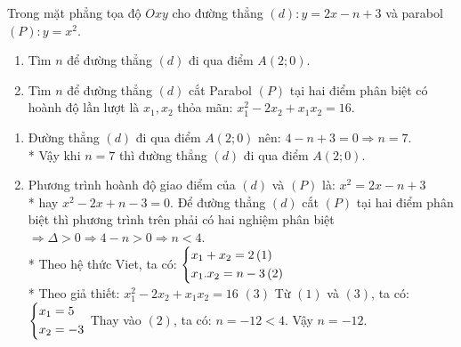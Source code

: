 \begin{ex}%
    Trong mặt phẳng tọa độ $Oxy$ cho đường thẳng $\left(d\right):y=2x-n+3$ và parabol $\left(P\right):y=x^{2}$.
    \begin{enumerate}
    \item Tìm $n$ để đường thẳng $\left(d\right)$ đi qua điểm $A(2;0)$.
    \item Tìm $n$ để đường thẳng $\left(d\right)$ cắt Parabol $\left(P\right)$ tại hai điểm phân biệt có hoành độ lần lượt là $x_{1},x_{2}$ thỏa mãn: $x_{1}^{2}-2x_{2}+x_{1}x_{2}=16$.
     \end{enumerate}
\loigiai
    {
    \begin{enumerate}
    \item Đường thẳng $\left(d\right)$ đi qua điểm $A(2;0)$ nên: $4-n+3=0 \Rightarrow n=7.$\\*
    Vậy khi $n=7$ thì đường thẳng $\left(d\right)$ đi qua điểm $A(2;0)$.
    \item Phương trình hoành độ giao điểm của $\left(d\right)$ và $\left(P\right)$ là: $x^{2}=2x-n+3$\\*
    hay $x^{2}-2x+n-3=0.$ Để đường thẳng $\left(d\right)$ cắt $\left(P\right)$ tại hai điểm phân biệt thì phương trình trên phải có hai nghiệm phân biệt $\Rightarrow \Delta > 0 \Rightarrow 4-n >0 \Rightarrow n<4$.\\*
    Theo hệ thức Viet, ta có: $\left\{\begin{aligned}&x_{1}+x_{2}=2\left(1\right)\\ &x_{1}.x_{2}=n-3\left(2\right)\end{aligned}\right.$\\*
    Theo giả thiết: $x_{1}^{2}-2x_{2}+x_{1}x_{2}=16$    $\left(3\right)$
    Từ $\left(1\right)$ và $\left(3\right)$, ta có: $\left\{\begin{aligned}&x_{1}=5\\ &x_{2}=-3\end{aligned}\right.$
    Thay vào $\left(2\right)$, ta có: $n=-12<4$. Vậy $n=-12$.
    \end{enumerate}
    }
\end{ex}

